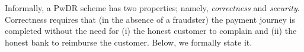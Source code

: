 





Informally, a PwDR scheme has two  properties; namely, \emph{correctness} and \emph{security}. Correctness requires that (in the absence of a fraudster) the payment journey is completed without the need for (i) the honest customer to complain and (ii)  the honest bank to reimburse the customer. Below, we formally state it.  


